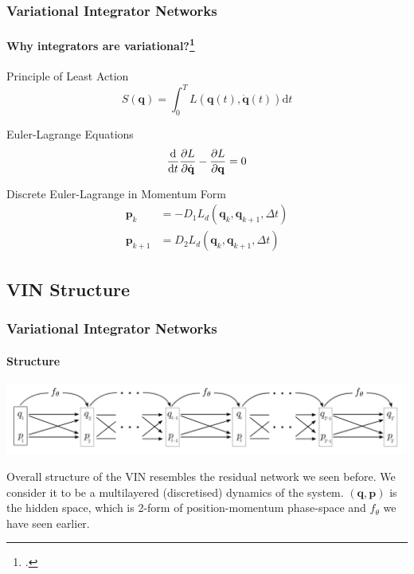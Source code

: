 \documentclass[
    11pt, %
    aspectratio=169, ]{beamer}%
\begin{document}
\begin{frame}
    \frametitle{Variational Integrator Networks}
    \framesubtitle{Why integrators are variational?\footcite{matthewwestVariationalIntegrators2004}}

    \small
    \begin{block}{ \small Principle of Least Action}
        \begin{equation}
            S(\mathbf{q}) = \int_{0}^{T}L(\mathbf{q}(t), \dot{\mathbf{q}}(t))\mathrm{d}t
        \end{equation}
    \end{block}

    \begin{block}{\small Euler-Lagrange Equations}
        \begin{equation}
            \frac{\mathrm{d}}{\mathrm{d}t}\pdv{L}{\dot{\mathbf{q}}} - \pdv{L}{\mathbf{q}} = 0
        \end{equation}
    \end{block}

    \begin{block}{\small Discrete Euler-Lagrange in Momentum Form}
        \begin{align}
            \mathbf{p}_k       & = -D_1L_d(\mathbf{q}_k, \mathbf{q}_{k+1}, \Delta t) \\
            \mathbf{p}_{k + 1} & = D_2L_d(\mathbf{q}_k, \mathbf{q}_{k+1}, \Delta t)
        \end{align}
    \end{block}

\end{frame}

\subsection{VIN Structure}

\begin{frame}
    \frametitle{Variational Integrator Networks}
    \framesubtitle{Structure}

    \includegraphics[width=15cm]{assets/deep-vin.png}

    Overall structure of the VIN resembles the residual network we seen before. We
    consider it to be a multilayered (discretised) dynamics of the system.
    \((\mathbf{q}, \mathbf{p})\) is the hidden space, which is 2-form of
    position-momentum phase-space and \(f_\theta\) we have seen earlier.

\end{frame}
\end{document}
